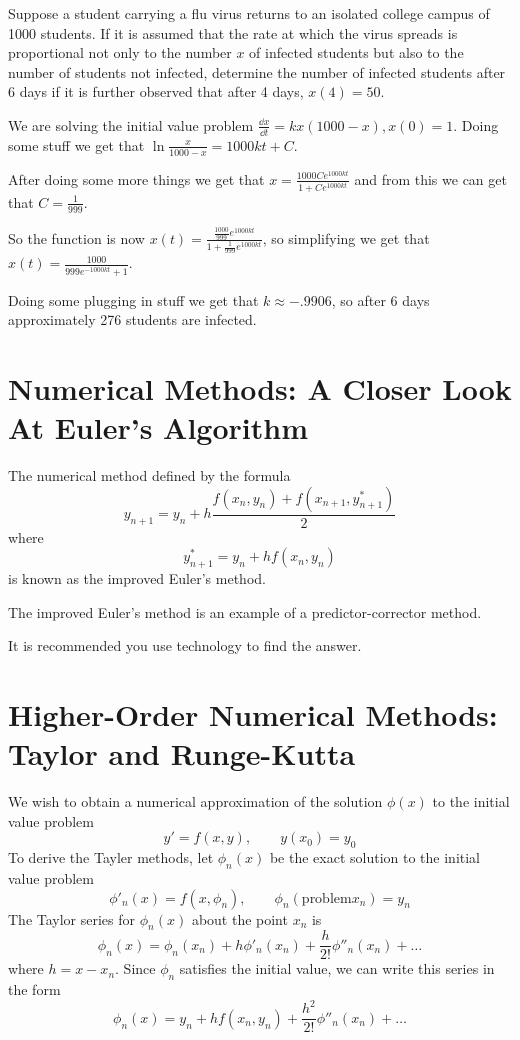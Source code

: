 \documentclass[../diffeq.tex]{subfiles}
\begin{document}
\pagebreak
\begin{example}
    Suppose a student carrying a flu virus returns to an isolated college campus of 1000 students. If it is assumed that the rate at which the virus spreads is proportional not only to the number $x$ of infected students 
    but also to the number of students not infected, determine the number of infected students after 6 days if it is further observed that after 4 days, $x(4)=50$.

    We are solving the initial value problem $\frac{\dd x}{\dd t}=kx(1000-x), x(0)=1$. Doing some stuff we get that $\ln \frac{x}{1000-x}=1000kt+C$.

    After doing some more things we get that $x=\frac{1000Ce^{1000kt}}{1+Ce^{1000kt}}$ and from this we can get that $C=\frac{1}{999}$.

    So the function is now $x(t)=\frac{\frac{1000}{999}e^{1000kt}}{1+\frac{1}{999}e^{1000kt}}$, so simplifying we get that $x(t)=\frac{1000}{999e^{-1000kt}+1}$.

    Doing some plugging in stuff we get that $k\approx -.9906$, so after 6 days approximately 276 students are infected.
\end{example}

\section{Numerical Methods: A Closer Look At Euler's Algorithm}
The numerical method defined by the formula 
\[ y_{n+1}=y_n+h\frac{f(x_n,y_n)+f(x_{n+1}, y_{n+1}^*)}{2} \]
where 
\[ y_{n+1}^* = y_n + hf(x_n,y_n) \]
is known as the improved Euler's method.

The improved Euler's method is an example of a predictor-corrector method.

It is recommended you use technology to find the answer.

\section{Higher-Order Numerical Methods: Taylor and Runge-Kutta}
We wish to obtain a numerical approximation of the solution $\phi(x)$ to the initial value problem 
\[ y' = f(x,y), \qquad y(x_0)=y_0 \]
To derive the Tayler methods, let $\phi_n(x)$ be the exact solution to the initial value problem 
\[ \phi'_n(x)=f(x,\phi_n), \qquad \phi_n(\text{problem}x_n)=y_n \]
The Taylor series for $\phi_n (x)$ about the point $x_n$ is 
\[ \phi_n (x) = \phi_n(x_n)+h\phi'_n(x_n)+\frac{h}{2!}\phi''_n (x_n)+\dots \]
where $h=x-x_n$. Since $\phi_n$ satisfies the initial value, we can write this series in the form 
\[ \phi_n(x)=y_n+hf(x_n,y_n)+\frac{h^2}{2!}\phi''_n(x_n)+\dots \]
\end{document}

